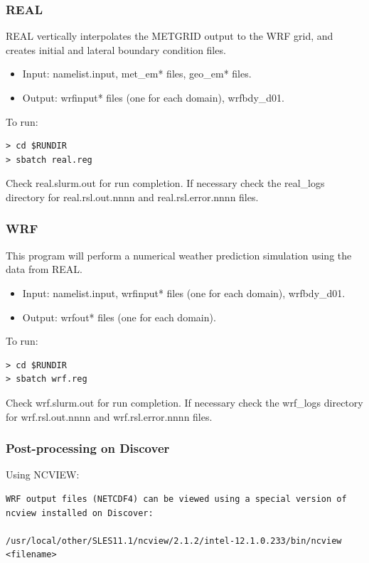 \begin{frame}[fragile]\frametitle{REAL}

\footnotesize{
REAL vertically interpolates the METGRID output to the WRF grid, and creates initial and lateral boundary condition files.
\begin{itemize}
\item Input: namelist.input, met\_em*  files, geo\_em* files.
\item Output: wrfinput* files (one for each domain), wrfbdy\_d01.
\end{itemize}
}    
\hrulefill\par
\footnotesize{To run:}
\begin{lstlisting}
> cd $RUNDIR
> sbatch real.reg
\end{lstlisting}
Check real.slurm.out for run completion.
If necessary check the real\_logs directory for real.rsl.out.nnnn and real.rsl.error.nnnn files.


\end{frame}

\begin{frame}[fragile]\frametitle{WRF}

\footnotesize{
This program will perform a numerical weather prediction simulation using the data from REAL.
\begin{itemize}
\item Input: namelist.input, wrfinput* files (one for each domain), wrfbdy\_d01.
\item Output: wrfout* files (one for each domain).
\end{itemize}
}    
\hrulefill\par
\footnotesize{To run:}
\begin{lstlisting}
> cd $RUNDIR
> sbatch wrf.reg
\end{lstlisting}

Check wrf.slurm.out for run completion.
If necessary check the wrf\_logs directory for wrf.rsl.out.nnnn and wrf.rsl.error.nnnn files.

\end{frame}

\begin{frame}[fragile]
\frametitle{Post-processing on Discover}

Using NCVIEW:

\begin{lstlisting}
WRF output files (NETCDF4) can be viewed using a special version of ncview installed on Discover:

/usr/local/other/SLES11.1/ncview/2.1.2/intel-12.1.0.233/bin/ncview <filename>
\end{lstlisting}

\end{frame}

